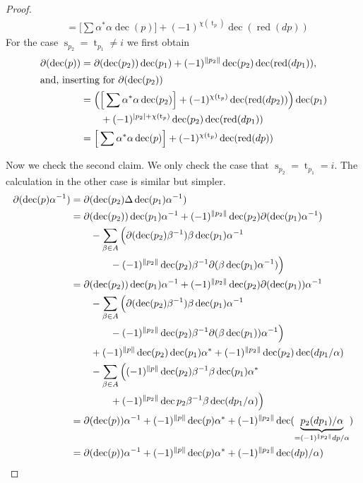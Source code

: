 \documentclass[a4paper,11pt]{amsart}
\theoremstyle{definition}
\DeclareMathOperator{\red}{red}
\DeclareMathOperator{\dec}{dec}
\newcommand{\ci}[1]{\chi(#1)}
\newcommand{\st}[1]{\operatorname{s}_{#1}}
\newcommand{\ta}[1]{\operatorname{t}_{#1}}
\numberwithin{theorem}{section}
\begin{document}
\begin{proof}
\begin{align*}
& = \Big[ \sum \alpha^* \alpha \dec(p) \Big] + (-1)^{\ci{ \ta{p}}} \dec( \red( dp))
\end{align*}
For the case $\st{p_2} = \ta{p_1} \neq i$ we first obtain
\begin{align*}
\partial( \dec(p) ) & = \partial(\dec(p_2)) \dec(p_1) + (-1)^{\| p_2 \|} \dec(p_2) \dec( \red( dp_1)), \\
\intertext{and, inserting for $\partial(\dec(p_2))$}
& = \Big( \Big[ \sum \alpha^* \alpha \dec(p_2) \Big] + (-1)^{\ci{ \ta{p}}} \dec(\red(dp_2)) \Big) \dec(p_1) \\
& \qquad + (-1)^{|p_2| + \ci{ \ta{p}}} \dec(p_2) \dec(\red(d p_1)) \\
& = \Big[ \sum \alpha^* \alpha \dec(p) \Big] + (-1)^{\ci{ \ta{p}}} \dec( \red( dp))
\end{align*}


Now we check the second claim. We only check the case that $\st{p_2} = \ta{p_1} = i$. The calculation in the other case is similar but simpler.
\begin{align*}
\partial( \dec(p) \alpha^{-1} ) & = \partial( \dec(p_2) \Delta \dec(p_1) \alpha^{-1} ) \\
& = \partial( \dec(p_2) ) \dec(p_1) \alpha^{-1} + (-1)^{\|p_2\|} \dec(p_2) \partial(\dec(p_1) \alpha^{-1}) \\
& \qquad - \sum_{\beta \in A} \Big( \partial(\dec(p_2) \beta^{-1}) \beta \dec(p_1) \alpha^{-1} \\
& \qquad \qquad - (-1)^{\|p_2\|} \dec(p_2) \beta^{-1} \partial( \beta \dec(p_1) \alpha^{-1}) \Big) \\
& =\partial( \dec(p_2) ) \dec(p_1) \alpha^{-1} + (-1)^{\|p_2\|} \dec(p_2) \partial(\dec(p_1)) \alpha^{-1} \\
& \qquad - \sum_{\beta \in A} \Big( \partial(\dec(p_2) \beta^{-1}) \beta \dec(p_1) \alpha^{-1} \\
& \qquad \qquad - (-1)^{\|p_2\|} \dec(p_2) \beta^{-1} \partial( \beta \dec(p_1)) \alpha^{-1} \Big) \\
& \qquad + (-1)^{\| p \|} \dec(p_2) \dec(p_1) \alpha^* + (-1)^{\|p_2\|} \dec(p_2) \dec( d p_1 / \alpha ) \\
& \qquad - \sum_{\beta \in A} \Big( (-1)^{\| p \|} \dec(p_2) \beta^{-1} \beta \dec(p_1) \alpha^* \\
& \qquad \qquad + (-1)^{\| p_2 \|} \dec{p_2} \beta^{-1} \beta \dec( d p_1 / \alpha) \Big) \\
& = \partial( \dec(p)) \alpha^{-1} + (-1)^{\| p \|} \dec(p) \alpha^* + (-1)^{\|p_2\|} \dec(\underbrace{p_2 (d p_1) / \alpha }_{= (-1)^{\| p_2 \|} dp / \alpha}) \\
& = \partial( \dec(p)) \alpha^{-1} + (-1)^{\| p \|} \dec(p) \alpha^* + (-1)^{\|p_2\|} \dec (d p) / \alpha ) \qedhere
\end{align*}
\end{proof}
\end{document}
